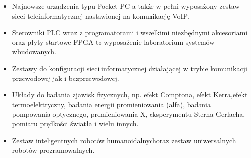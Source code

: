 ﻿\documentclass[a4paper,12pt]{article}
\begin{document}
\begin {itemize}
\item Najnowsze urządzenia typu Pocket PC a także w pełni
 wyposażony zestaw sieci teleinformatycznej
nastawionej na komunikację VoIP.
\item Sterowniki PLC wraz z programatorami i wszelkimi niezbędnymi
 akcesoriami oraz płyty startowe FPGA
to wyposażenie laboratorium systemów wbudowanych.
\item Zestawy do konfiguracji sieci informatycznej działającej w trybie komunikacji przewodowej jak i
bezprzewodowej.
\item Układy do badania zjawisk fizycznych, np. efekt Comptona, efekt Kerra,\newline efekt termoelektryczny, badania
energii promieniowania (alfa), badania pompowania optycznego, promieniowania X, 
eksperymentu Sterna-Gerlacha, pomiaru prędkości światła i wielu innych.
\item Zestaw inteligentnych robotów humanoidalnych\newline oraz zestaw uniwersalnych robotów programowalnych.
\end{itemize}
\end{document}
